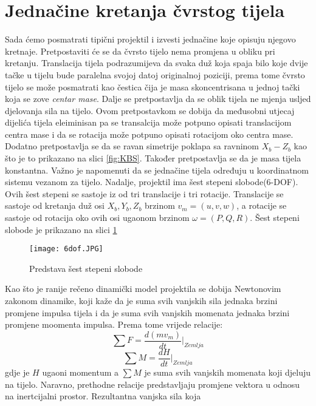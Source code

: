 \section{Jednačine kretanja čvrstog tijela}
Sada ćemo posmatrati tipični projektil i izvesti jednačine koje opisuju njegovo kretnaje.
Pretpostaviti će se da čvrsto tijelo nema promjena u obliku pri kretanju. Translacija tijela 
podrazumijeva da svaka duž koja spaja bilo koje dvije tačke u tijelu bude paralelna svojoj
datoj originalnoj poziciji, prema tome čvrsto tijelo se može posmatrati kao čestica čija je 
masa skoncentrisana u jednoj tački koja se zove \textit{centar mase}. Dalje se pretpostavlja 
da se oblik tijela ne mjenja usljed djelovanja sila na tijelo. Ovom pretpostavkom se 
dobija da međusobni utjecaj dijelića tijela eleiminisan pa se transalcija može potpuno opisati
translacijom centra mase i da se rotacija može potpuno opisati rotacijom oko centra mase. Dodatno 
pretpostavlja se da se ravan simetrije poklapa sa ravninom $X_b - Z_b$ kao što je to prikazano na 
slici \ref{fig:KBS}. Također pretpostavlja se da je masa tijela konstantna. Važno je 
napomenuti da se jednačine tijela određuju u koordinatnom sistemu vezanom za tijelo. 
Nadalje, projektil ima šest stepeni slobode(6-DOF). Ovih šest stepeni se sastoje iz od tri translacije i 
tri rotacije. Translacije se sastoje od kretanja duž osi $X_b,Y_b,Z_b$ brzinom $v_m=(u,v,w)$, a rotacije se sastoje 
od rotacija oko ovih osi ugaonom brzinom $\omega = (P,Q,R)$. Šest stepeni slobode je prikazano
na slici \ref{fig:dof} 
\begin{figure}
    \centering
    \texttt{[image: 6dof.JPG]}
    \caption{Predstava šest stepeni slobode}
    \label{fig:dof}
\end{figure}
Kao što je ranije rečeno dinamički model projektila se dobija Newtonovim zakonom dinamike,
koji kaže da je suma svih vanjskih sila jednaka brzini promjene impulsa tijela i da je 
suma svih vanjskih momenata jednaka brzini promjene moomenta impulsa. Prema tome vrijede relacije:
\begin{equation}
    \sum F=\frac{d(mv_m)}{dt}|_{Zemlja}
    \label{eq:f}
\end{equation}
\begin{equation}
    \sum M=\frac{dH}{dt}|_{Zemlja}
    \label{eq:m}
\end{equation}
gdje je $H$ ugaoni momentum a $\sum M$ je suma svih vanjskih momenata koji djeluju na tijelo. Naravno, prethodne 
relacije predstavljaju promjene vektora u odnosu na inertcijalni prostor. Rezultantna vanjska sila koja 
